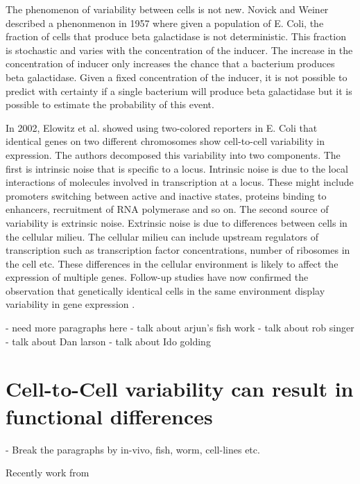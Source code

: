 The phenomenon of variability between cells is not new. Novick and Weiner \cite{novick_enzyme_1957} \cite{raj_nature_2008} described a phenonmenon in 1957 where given a population of E. Coli, the fraction of cells that produce beta galactidase is not deterministic. This fraction is stochastic and varies with the concentration of the inducer. The increase in the concentration of inducer only increases the chance that a bacterium produces beta galactidase. Given a fixed concentration of the inducer, it is not possible to predict with certainty if a single bacterium will produce beta galactidase but it is possible to estimate the probability of this event.

In 2002, Elowitz et al.  \cite{elowitz_stochastic_2002} showed using two-colored reporters in E. Coli that identical genes on two different chromosomes show cell-to-cell variability in expression. The authors decomposed this variability into two components. The first is intrinsic noise that is specific to a locus. Intrinsic noise is due to the local interactions of molecules involved in transcription at a locus. These might include promoters switching between active and inactive states, proteins binding to enhancers, recruitment of RNA polymerase and so on. The second source of variability is extrinsic noise. Extrinsic noise is due to differences between cells in the cellular milieu. The cellular milieu can include upstream regulators of transcription such as transcription factor concentrations, number of ribosomes in the cell etc. These differences in the cellular environment is likely to affect the expression of multiple genes. Follow-up studies have now confirmed the observation that genetically identical cells in the same environment display variability in gene expression \cite{raser_control_2004,blake_phenotypic_2006,blake_noise_2003,raser_noise_2005,volfson_origins_2006}.

- need more paragraphs here
- talk about arjun's fish work
- talk about rob singer
- talk about Dan larson
- talk about Ido golding


\section{Cell-to-Cell variability can result in functional differences}

- Break the paragraphs by in-vivo, fish, worm, cell-lines etc.

Recently work from 



